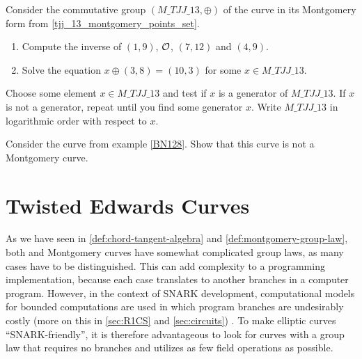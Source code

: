 \begin{exercise}
Consider the commutative group $(\mathit{M\_TJJ\_13},\oplus)$ of the  curve in its Montgomery form from \examplename{} \eqref{tjj_13_montgomery_points_set}. 
\begin{enumerate}
\item Compute the inverse of $(1,9)$, $\mathcal{O}$, $(7,12)$ and $(4,9)$.
\item Solve the equation $x \oplus (3,8) = (10,3) $ for some $x\in \mathit{M\_TJJ\_13}$.
\end{enumerate}
Choose some element $x\in \mathit{M\_TJJ\_13}$ and test if $x$ is a generator of $\mathit{M\_TJJ\_13}$. If $x$ is not a generator, repeat until you find some generator $x$. Write $\mathit{M\_TJJ\_13}$ in logarithmic order with respect to $x$.
\end{exercise}
\begin{exercise}
Consider the curve  from example \ref{BN128}. Show that this curve is not a Montgomery curve.
\end{exercise}

\section{Twisted Edwards Curves}\label{sec:edwards}
As we have seen in  \ref{def:chord-tangent-algebra} and  \ref{def:montgomery-group-law}, both  and Montgomery curves have somewhat complicated group laws, as many cases have to be distinguished. This can add complexity to a programming implementation, because each case translates to another branches in a computer program. However, in the context of SNARK development, computational models for bounded computations are used in which program branches are undesirably costly (more on this in \secname{} \ref{sec:R1CS} and \ref{sec:circuits}) .  To make elliptic curves ``SNARK-friendly'', it is therefore advantageous to look for curves with a group law that requires no branches and utilizes as few field operations as possible.

